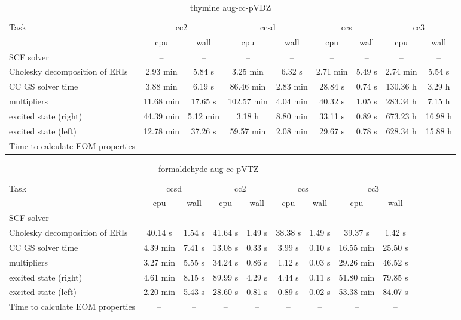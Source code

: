 \documentclass{article}
\begin{document}
\begin{table}
\caption{thymine aug-cc-pVDZ}
\begin{tabular}{lcccccccc}
\toprule
Task & \multicolumn{2}{c}{cc2} & \multicolumn{2}{c}{ccsd} & \multicolumn{2}{c}{ccs} & \multicolumn{2}{c}{cc3}\\
\cmidrule(lr){2-3}\cmidrule(lr){4-5}\cmidrule(lr){6-7}\cmidrule(lr){8-9}
 & cpu & wall & cpu & wall & cpu & wall & cpu & wall\\
\midrule
SCF solver & -- & -- & -- & -- & -- & -- & -- & --\\
Cholesky decomposition of ERIs & 2.93 min & 5.84 s & 3.25 min & 6.32 s & 2.71 min & 5.49 s & 2.74 min & 5.54 s\\
CC GS solver time & 3.88 min & 6.19 s & 86.46 min & 2.83 min & 28.84 s & 0.74 s & 130.36 h & 3.29 h\\
multipliers & 11.68 min & 17.65 s & 102.57 min & 4.04 min & 40.32 s & 1.05 s & 283.34 h & 7.15 h\\
excited state (right) & 44.39 min & 5.12 min & 3.18 h & 8.80 min & 33.11 s & 0.89 s & 673.23 h & 16.98 h\\
excited state (left) & 12.78 min & 37.26 s & 59.57 min & 2.08 min & 29.67 s & 0.78 s & 628.34 h & 15.88 h\\
Time to calculate EOM properties & -- & -- & -- & -- & -- & -- & -- & --\\
\bottomrule
\end{tabular}
\end{table}
\begin{table}
\caption{formaldehyde aug-cc-pVTZ}
\begin{tabular}{lcccccccc}
\toprule
Task & \multicolumn{2}{c}{ccsd} & \multicolumn{2}{c}{cc2} & \multicolumn{2}{c}{ccs} & \multicolumn{2}{c}{cc3}\\
\cmidrule(lr){2-3}\cmidrule(lr){4-5}\cmidrule(lr){6-7}\cmidrule(lr){8-9}
 & cpu & wall & cpu & wall & cpu & wall & cpu & wall\\
\midrule
SCF solver & -- & -- & -- & -- & -- & -- & -- & --\\
Cholesky decomposition of ERIs & 40.14 s & 1.54 s & 41.64 s & 1.49 s & 38.38 s & 1.49 s & 39.37 s & 1.42 s\\
CC GS solver time & 4.39 min & 7.41 s & 13.08 s & 0.33 s & 3.99 s & 0.10 s & 16.55 min & 25.50 s\\
multipliers & 3.27 min & 5.55 s & 34.24 s & 0.86 s & 1.12 s & 0.03 s & 29.26 min & 46.52 s\\
excited state (right) & 4.61 min & 8.15 s & 89.99 s & 4.29 s & 4.44 s & 0.11 s & 51.80 min & 79.85 s\\
excited state (left) & 2.20 min & 5.43 s & 28.60 s & 0.81 s & 0.89 s & 0.02 s & 53.38 min & 84.07 s\\
Time to calculate EOM properties & -- & -- & -- & -- & -- & -- & -- & --\\
\bottomrule
\end{tabular}
\end{table}
\end{document}
